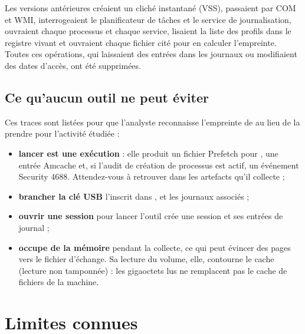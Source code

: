 \documentclass[11pt,a4paper,oneside]{report}
\begin{document}
Les versions antérieures créaient un cliché instantané (VSS), passaient par COM et
WMI, interrogeaient le planificateur de tâches et le service de journalisation,
ouvraient chaque processus et chaque service, lisaient la liste des profils dans
le registre vivant et ouvraient chaque fichier cité pour en calculer
l'empreinte. Toutes ces opérations, qui laissaient des entrées dans les journaux
ou modifiaient des dates d'accès, ont été supprimées.

\section{Ce qu'aucun outil ne peut éviter}

Ces traces sont listées pour que l'analyste reconnaisse l'empreinte de \wac{} au
lieu de la prendre pour l'activité étudiée :

\begin{itemize}
  \item \textbf{lancer  est une exécution} : elle produit un
        fichier Prefetch pour , une entrée Amcache et, si
        l'audit de création de processus est actif, un événement Security 4688.
        Attendez-vous à retrouver \wac{} dans les artefacts qu'il collecte ;
  \item \textbf{brancher la clé USB} l'inscrit dans ,
         et les journaux associés ;
  \item \textbf{ouvrir une session} pour lancer l'outil crée une session et ses
        entrées de journal ;
  \item \wac{} \textbf{occupe de la mémoire} pendant la collecte, ce qui peut
        évincer des pages vers le fichier d'échange. Sa lecture du volume, elle,
        contourne le cache (lecture non tamponnée) : les gigaoctets lus ne
        remplacent pas le cache de fichiers de la machine.
\end{itemize}

\chapter{Limites connues}
\end{document}
